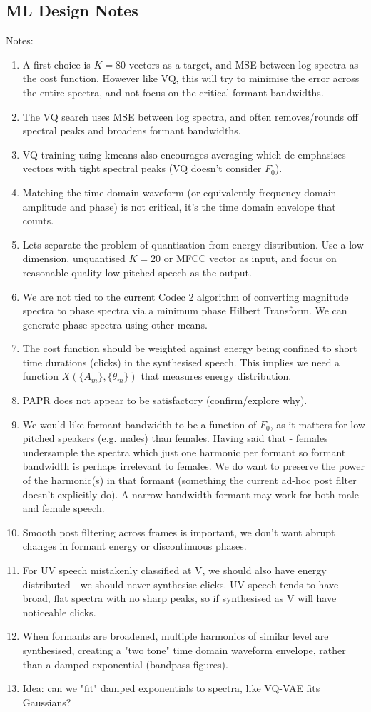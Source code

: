 \documentclass{article}
\begin{document}
\subsection{ML Design Notes}

Notes:
\begin{enumerate}
\item A first choice is $K=80$ vectors as a target, and MSE between log spectra as the cost function.  However like VQ, this will try to minimise the error across the entire spectra, and not focus on the critical formant bandwidths.
\item The VQ search uses MSE between log spectra, and often removes/rounds off spectral peaks and broadens formant bandwidths.  
\item VQ training using kmeans also encourages averaging which de-emphasises vectors with tight spectral peaks (VQ doesn't consider $F_0$).
\item Matching the time domain waveform (or equivalently frequency domain amplitude and phase) is not critical, it's the time domain envelope that counts.
\item Lets separate the problem of quantisation from energy distribution.  Use a low dimension, unquantised $K=20$ or MFCC vector as input, and focus on reasonable quality low pitched speech as the output.
\item We are not tied to the current Codec 2 algorithm of converting magnitude spectra to phase spectra via a minimum phase Hilbert Transform.  We can generate phase spectra using other means.
\item The cost function should be weighted against energy being confined to short time durations (clicks) in the synthesised speech.  This implies we need a function $X(\{A_m\},\{\theta_m\})$ that measures energy distribution.
\item PAPR does not appear to be satisfactory (confirm/explore why).
\item We would like formant bandwidth to be a function of $F_0$, as it matters for low pitched speakers (e.g. males) than females.  Having said that - females undersample the spectra which just one harmonic per formant so formant bandwidth is perhaps irrelevant to females.  We do want to preserve the power of the harmonic(s) in that formant (something the current ad-hoc post filter doesn't explicitly do).  A narrow bandwidth formant may work for both male and female speech.
\item Smooth post filtering across frames is important, we don't want abrupt changes in formant energy or discontinuous phases.
\item For UV speech mistakenly classified at V, we should also have energy distributed - we should never synthesise clicks.  UV speech tends to have broad, flat spectra with no sharp peaks, so if synthesised as V will have noticeable clicks.
\item When formants are broadened, multiple harmonics of similar level are synthesised, creating a "two tone" time domain waveform envelope, rather than a damped exponential (bandpass figures).
\item Idea: can we "fit" damped exponentials to spectra, like VQ-VAE fits Gaussians?
\end{enumerate}
\end{document}
